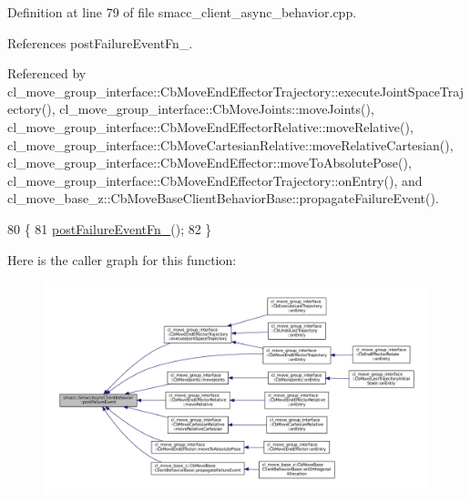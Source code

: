 Definition at line 79 of file smacc\+\_\+client\+\_\+async\+\_\+behavior.\+cpp.



References post\+Failure\+Event\+Fn\+\_\+.



Referenced by cl\+\_\+move\+\_\+group\+\_\+interface\+::\+Cb\+Move\+End\+Effector\+Trajectory\+::execute\+Joint\+Space\+Trajectory(), cl\+\_\+move\+\_\+group\+\_\+interface\+::\+Cb\+Move\+Joints\+::move\+Joints(), cl\+\_\+move\+\_\+group\+\_\+interface\+::\+Cb\+Move\+End\+Effector\+Relative\+::move\+Relative(), cl\+\_\+move\+\_\+group\+\_\+interface\+::\+Cb\+Move\+Cartesian\+Relative\+::move\+Relative\+Cartesian(), cl\+\_\+move\+\_\+group\+\_\+interface\+::\+Cb\+Move\+End\+Effector\+::move\+To\+Absolute\+Pose(), cl\+\_\+move\+\_\+group\+\_\+interface\+::\+Cb\+Move\+End\+Effector\+Trajectory\+::on\+Entry(), and cl\+\_\+move\+\_\+base\+\_\+z\+::\+Cb\+Move\+Base\+Client\+Behavior\+Base\+::propagate\+Failure\+Event().


\begin{DoxyCode}
80     \{
81         \hyperlink{classsmacc_1_1SmaccAsyncClientBehavior_a8041c43a0381f18fae6470a98eb9273d}{postFailureEventFn\_}();
82     \}
\end{DoxyCode}
Here is the caller graph for this function\+:
\nopagebreak
\begin{figure}[H]
\begin{center}
\leavevmode
\includegraphics[width=350pt]{classsmacc_1_1SmaccAsyncClientBehavior_af6fa358cb1ab5ed16791a201f59260e0_icgraph}
\end{center}
\end{figure}
\mbox{\label{classsmacc_1_1SmaccAsyncClientBehavior_adf18efe1f0e4eacc1277b8865a8a94b1}} 

